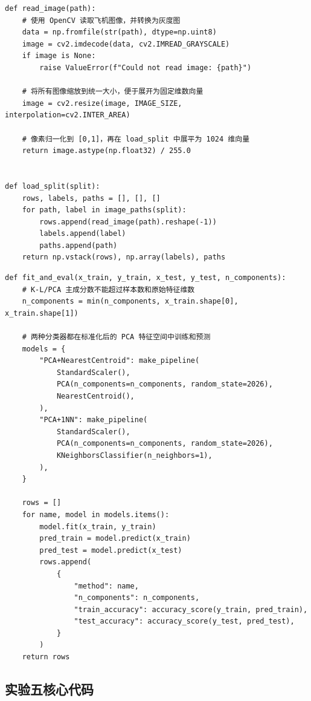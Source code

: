 \documentclass[UTF8,a4paper,12pt]{ctexart}
\begin{document}
\begin{lstlisting}[caption={Exp.4 supplementary aircraft image loading},label={lst:exp4-plane-load}]
def read_image(path):
    # 使用 OpenCV 读取飞机图像，并转换为灰度图
    data = np.fromfile(str(path), dtype=np.uint8)
    image = cv2.imdecode(data, cv2.IMREAD_GRAYSCALE)
    if image is None:
        raise ValueError(f"Could not read image: {path}")

    # 将所有图像缩放到统一大小，便于展开为固定维数向量
    image = cv2.resize(image, IMAGE_SIZE, interpolation=cv2.INTER_AREA)

    # 像素归一化到 [0,1]，再在 load_split 中展平为 1024 维向量
    return image.astype(np.float32) / 255.0


def load_split(split):
    rows, labels, paths = [], [], []
    for path, label in image_paths(split):
        rows.append(read_image(path).reshape(-1))
        labels.append(label)
        paths.append(path)
    return np.vstack(rows), np.array(labels), paths
\end{lstlisting}

\begin{lstlisting}[caption={Exp.4 supplementary aircraft PCA classifiers},label={lst:exp4-plane-classifier}]
def fit_and_eval(x_train, y_train, x_test, y_test, n_components):
    # K-L/PCA 主成分数不能超过样本数和原始特征维数
    n_components = min(n_components, x_train.shape[0], x_train.shape[1])

    # 两种分类器都在标准化后的 PCA 特征空间中训练和预测
    models = {
        "PCA+NearestCentroid": make_pipeline(
            StandardScaler(),
            PCA(n_components=n_components, random_state=2026),
            NearestCentroid(),
        ),
        "PCA+1NN": make_pipeline(
            StandardScaler(),
            PCA(n_components=n_components, random_state=2026),
            KNeighborsClassifier(n_neighbors=1),
        ),
    }

    rows = []
    for name, model in models.items():
        model.fit(x_train, y_train)
        pred_train = model.predict(x_train)
        pred_test = model.predict(x_test)
        rows.append(
            {
                "method": name,
                "n_components": n_components,
                "train_accuracy": accuracy_score(y_train, pred_train),
                "test_accuracy": accuracy_score(y_test, pred_test),
            }
        )
    return rows
\end{lstlisting}

\subsection{实验五核心代码}
\end{document}
